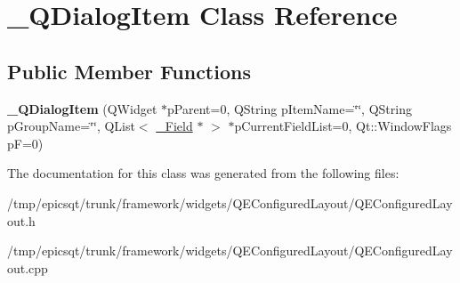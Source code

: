 \hypertarget{class__QDialogItem}{
\section{\_\-QDialogItem Class Reference}
\label{class__QDialogItem}
}
\subsection*{Public Member Functions}
\begin{DoxyCompactItemize}
\item 
\hypertarget{class__QDialogItem_ae6a2e001ba20bd3a05b80253264b6e56}{
{\bfseries \_\-QDialogItem} (QWidget $\ast$pParent=0, QString pItemName=\char`\"{}\char`\"{}, QString pGroupName=\char`\"{}\char`\"{}, QList$<$ \hyperlink{class__Field}{\_\-Field} $\ast$ $>$ $\ast$pCurrentFieldList=0, Qt::WindowFlags pF=0)}
\label{class__QDialogItem_ae6a2e001ba20bd3a05b80253264b6e56}

\end{DoxyCompactItemize}


The documentation for this class was generated from the following files:\begin{DoxyCompactItemize}
\item 
/tmp/epicsqt/trunk/framework/widgets/QEConfiguredLayout/QEConfiguredLayout.h\item 
/tmp/epicsqt/trunk/framework/widgets/QEConfiguredLayout/QEConfiguredLayout.cpp\end{DoxyCompactItemize}
